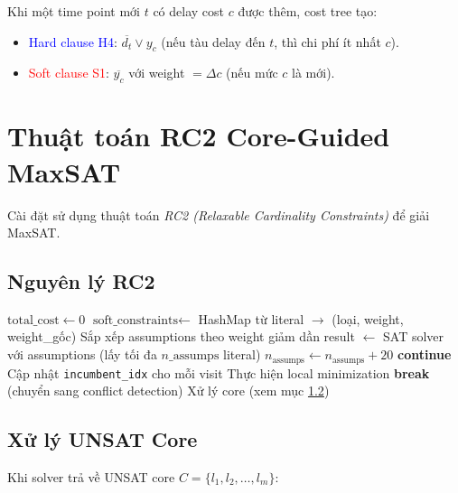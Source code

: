 \documentclass[11pt,a4paper]{article}
\begin{document}
Khi một time point mới $t$ có delay cost $c$ được thêm, cost tree tạo:
\begin{itemize}
  \item \textcolor{blue}{Hard clause H4}: $\overline{d_t} \vee y_c$ (nếu tàu delay đến $t$, thì chi phí ít nhất $c$).
  \item \textcolor{red}{Soft clause S1}: $\overline{y_c}$ với weight $= \Delta c$ (nếu mức $c$ là mới).
\end{itemize}


\section{Thuật toán RC2 Core-Guided MaxSAT}
\label{sec:rc2}

Cài đặt sử dụng thuật toán \emph{RC2 (Relaxable Cardinality Constraints)} để giải MaxSAT.

\subsection{Nguyên lý RC2}

\begin{algorithm}[H]
\caption{RC2 MaxSAT Loop (tích hợp trong DDD)}
\begin{algorithmic}[1]
\State $\text{total\_cost} \gets 0$
\State $\text{soft\_constraints} \gets$ HashMap từ literal $\to$ (loại, weight, weight\_gốc)
\Loop
  \State Sắp xếp assumptions theo weight giảm dần
  \State result $\gets$ SAT solver với assumptions (lấy tối đa $n\_\text{assumps}$ literal)
    \State $n_\text{assumps} \gets n_\text{assumps} + 20$ 
    \State \textbf{continue}
    \State Cập nhật \texttt{incumbent\_idx} cho mỗi visit
    \State Thực hiện local minimization
    \State \textbf{break} (chuyển sang conflict detection)
    \State Xử lý core (xem mục \ref{sec:core})
  \EndIf
\EndLoop
\end{algorithmic}
\end{algorithm}

\subsection{Xử lý UNSAT Core}
\label{sec:core}

Khi solver trả về UNSAT core $C = \{l_1, l_2, \ldots, l_m\}$:
\end{document}
